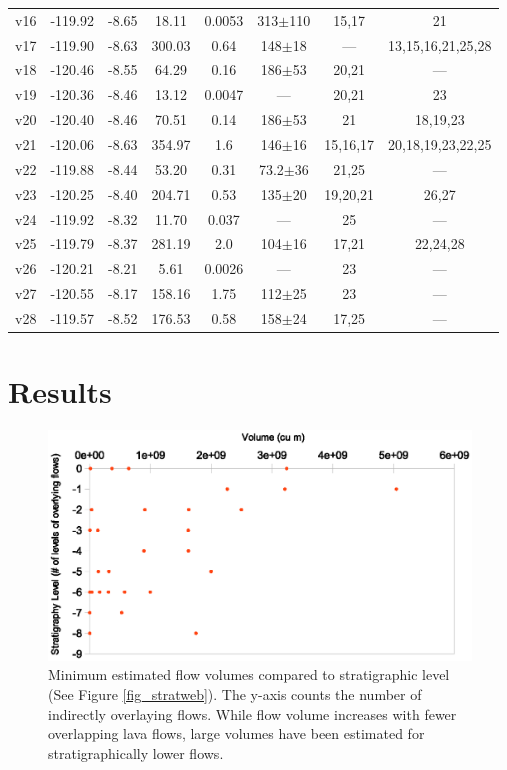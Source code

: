 \documentclass[12pt,letter]{article}
\begin{document}
\begin{table}[h!]
\begin{tabular}{l c c c c c c c}
			v16 & -119.92 & -8.65 & 18.11 & 0.0053 & 313$\pm$110 & 15,17 & 21\\
			v17 & -119.90 & -8.63 & 300.03 & 0.64 & 148$\pm$18 & --- & 13,15,16,21,25,28\\
			v18 & -120.46 & -8.55 & 64.29 & 0.16 & 186$\pm$53 & 20,21 & ---\\
			v19 & -120.36 & -8.46 & 13.12 & 0.0047 & --- & 20,21 & 23\\
			v20 & -120.40 & -8.46 & 70.51 & 0.14 & 186$\pm$53 & 21 & 18,19,23\\
			v21 & -120.06 & -8.63 & 354.97 & 1.6 & 146$\pm$16 & 15,16,17 & 20,18,19,23,22,25\\
			v22 & -119.88 & -8.44 & 53.20 & 0.31 & 73.2$\pm$36 & 21,25 & ---\\
			v23 & -120.25 & -8.40 & 204.71 & 0.53 & 135$\pm$20 & 19,20,21 & 26,27\\
			v24 & -119.92 & -8.32 & 11.70 & 0.037 & --- & 25 & ---\\
			v25 & -119.79 & -8.37 & 281.19 & 2.0 & 104$\pm$16 & 17,21 & 22,24,28\\
			v26 & -120.21 & -8.21 & 5.61 & 0.0026 & --- & 23 & ---\\
			v27 & -120.55 & -8.17 & 158.16 & 1.75 & 112$\pm$25 & 23 & ---\\
			v28 & -119.57 & -8.52 & 176.53 & 0.58 & 158$\pm$24 & 17,25 & ---\\
		\bottomrule
	\end{tabular}
	\label{tab_database}
	\end{table}


\section{Results}

\begin{figure}
\centering
\includegraphics[width=0.4\linewidth]{figures/volumeandstratigraphy}
\caption{Minimum estimated flow volumes compared to stratigraphic level (See Figure \ref{fig_stratweb}). The y-axis counts the number of indirectly overlaying flows. While flow volume increases with fewer overlapping lava flows, large volumes have been estimated for stratigraphically lower flows.}
\label{fig_volumeandstrat}
\end{figure}
\end{document}
